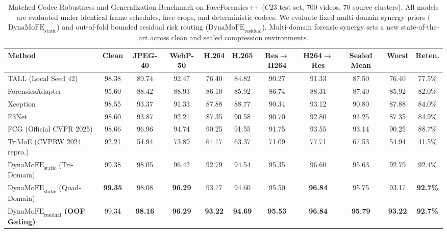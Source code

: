 \documentclass[conference]{IEEEtran}
\begin{document}
\begin{table}[t]
\centering
\caption{Matched Codec Robustness and Generalization Benchmark on FaceForensics++ ($C23$ test set, 700 videos, 70 source clusters). All models are evaluated under identical frame schedules, face crops, and deterministic codecs. We evaluate fixed multi-domain synergy priors ($\text{DynaMoFE}_{\text{static}}$) and out-of-fold bounded residual risk routing ($\text{DynaMoFE}_{\text{residual}}$). Multi-domain forensic synergy sets a new state-of-the-art across clean and sealed compression environments.}
\label{tab:main_benchmark}
\small
\setlength{\tabcolsep}{4.2pt}
\begin{tabular}{lcccccccc|cc}
\toprule
\textbf{Method} & \textbf{Clean} & \textbf{JPEG-40} & \textbf{WebP-50} & \textbf{H.264} & \textbf{H.265} & \textbf{Res$\rightarrow$H264} & \textbf{H264$\rightarrow$Res} & \textbf{Sealed Mean} & \textbf{Worst} & \textbf{Reten.} \\
\midrule
TALL (Local Seed 42) & 98.38 & 89.74 & 92.47 & 76.40 & 84.82 & 90.27 & 91.33 & 87.50 & 76.40 & 77.5\% \\
ForensicsAdapter & 95.60 & 88.42 & 88.93 & 86.10 & 85.92 & 86.74 & 88.31 & 87.40 & 85.92 & 82.0\% \\
Xception & 98.55 & 93.37 & 91.33 & 87.88 & 88.77 & 90.34 & 93.12 & 90.80 & 87.88 & 84.0\% \\
F3Net & 98.60 & 93.87 & 92.21 & 87.35 & 90.58 & 90.70 & 92.80 & 91.25 & 87.35 & 84.9\% \\
FCG (Official CVPR 2025) & 98.66 & 96.96 & 94.74 & 90.25 & 91.55 & 91.75 & 93.55 & 93.14 & 90.25 & 88.7\% \\
TriMoE (CVPRW 2024 repro.) & 92.21 & 54.94 & 73.89 & 64.17 & 63.37 & 71.09 & 77.71 & 67.53 & 54.94 & 41.5\% \\
\midrule
$\text{DynaMoFE}_{\text{static}}$ (Tri-Domain) & 99.38 & 98.05 & 96.42 & 92.79 & 94.54 & 95.35 & 96.60 & 95.63 & 92.79 & 92.4\% \\
$\text{DynaMoFE}_{\text{static}}$ (Quad-Domain) & \textbf{99.35} & 98.08 & \textbf{96.29} & 93.17 & 94.60 & 95.50 & \textbf{96.84} & 95.75 & 93.17 & \textbf{92.7\%} \\
\textbf{$\text{DynaMoFE}_{\text{residual}}$ (OOF Gating)} & 99.34 & \textbf{98.16} & \textbf{96.29} & \textbf{93.22} & \textbf{94.69} & \textbf{95.53} & \textbf{96.84} & \textbf{95.79} & \textbf{93.22} & \textbf{92.7\%} \\
\bottomrule
\end{tabular}
\end{table}
\end{document}
